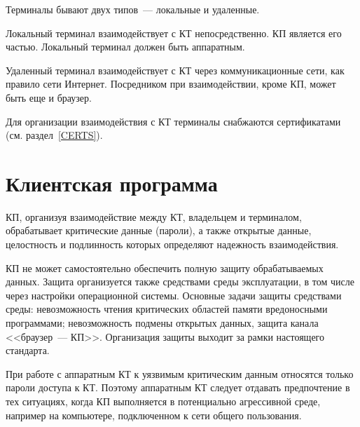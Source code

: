 Терминалы бывают двух типов~--- локальные и удаленные.

Локальный терминал взаимодействует с КТ непосредственно. КП является 
его частью. Локальный терминал должен быть аппаратным.

Удаленный терминал взаимодействует с КТ через коммуникационные сети,
как правило сети Интернет. Посредником при взаимодействии, 
кроме КП, может быть еще и браузер. 

Для организации взаимодействия с КТ терминалы снабжаются сертификатами
(см. раздел~\ref{CERTS}).

\section{Клиентская программа}

КП, организуя взаимодействие между КТ, владельцем и терминалом,
обрабатывает критические данные (пароли), а также открытые данные, 
целостность и подлинность которых определяют надежность  
взаимодействия.

КП не может самостоятельно 
обеспечить полную защиту обрабатываемых данных. 
Защита организуется также средствами среды эксплуатации, 
в том числе через настройки операционной системы.  
%
Основные задачи защиты средствами среды: 
невозможность чтения критических областей памяти вредоносными программами; 
невозможность подмены открытых данных,
защита канала <<браузер~--- КП>>.
%
Организация защиты выходит за рамки настоящего стандарта.

При работе с аппаратным КТ к уязвимым критическим данным
относятся только пароли доступа к КТ. Поэтому аппаратным КТ следует отдавать 
предпочтение в тех ситуациях, когда КП выполняется в потенциально агрессивной 
среде, например на компьютере, подключенном к сети общего пользования.

